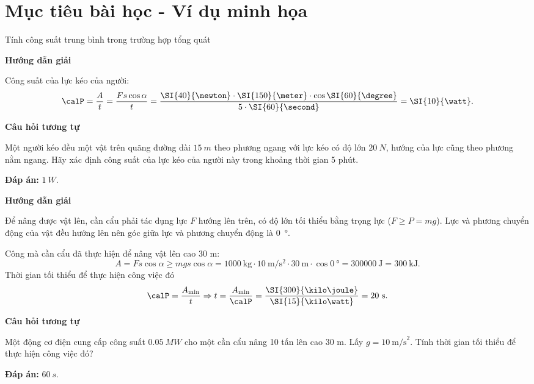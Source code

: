 \section{Mục tiêu bài học - Ví dụ minh họa}
\begin{dang}{Tính công suất trung bình trong trường hợp tổng quát}
	{	\begin{center}
			\textbf{Hướng dẫn giải}
		\end{center}
		Công suất của lực kéo của người:
		$$\calP = \dfrac{A}{t} = \dfrac{Fs\cos \alpha}{t}=\dfrac{\SI{40}{\newton}\cdot\SI{150}{\meter
			}\cdot\cos\SI{60}{\degree}}{5\cdot\SI{60}{\second}}= \SI{10}{\watt}.$$
		
		\begin{center}
			\textbf{Câu hỏi tương tự}
		\end{center}
		
		Một người kéo đều một vật trên quãng đường dài $\SI{15}{m}$ theo phương ngang với lực kéo có độ lớn $\SI{20}{N}$, hướng của lực cũng theo phương nằm ngang. Hãy xác định công suất của lực kéo của người này trong khoảng thời gian 5 phút.
		
		\textbf{Đáp án:} $\SI{1}{W}$.
	}
	{	\begin{center}
			\textbf{Hướng dẫn giải}
		\end{center}
		Để nâng được vật lên, cần cẩu phải tác dụng lực $F$ hướng lên trên, có độ lớn tối thiểu bằng trọng lực ($F\geq P=mg$). Lực và phương chuyển động của vật đều hướng lên nên góc giữa lực và phương chuyển động là \SI{0}{\degree}.
		
		Công mà cần cẩu đã thực hiện để nâng vật lên cao 30 m:
		\begin{equation*}
			A=Fs \cos \alpha \geq mg s\cos \alpha =\SI{1000}{\kilogram}\cdot\SI{10}{\meter/\second^2}\cdot\SI{30}{\meter}\cdot\cos\SI{0}{\degree}= \SI{300000}{\joule}=\SI{300}{\kilo\joule}.
		\end{equation*}
		Thời gian tối thiểu để thực hiện công việc đó
		\begin{equation*}
			\calP=\dfrac{A_{\min}}{t} \Rightarrow t =\dfrac{A_{\min}}{\calP}=\dfrac{\SI{300}{\kilo\joule}}{\SI{15}{\kilo\watt}}= 20\ \text{s}.
		\end{equation*}
		
		
		\begin{center}
			\textbf{Câu hỏi tương tự}
		\end{center}
		
		Một động cơ điện cung cấp công suất $\SI{0.05}{MW}$ cho một cần cẩu nâng 10 tấn lên cao 30 m. Lấy $g=10\ \text{m/s}^2$. Tính thời gian tối thiểu để thực hiện công việc đó?
		
		\textbf{Đáp án:} $\SI{60}{s}$.
		
		
	}
\end{dang}

